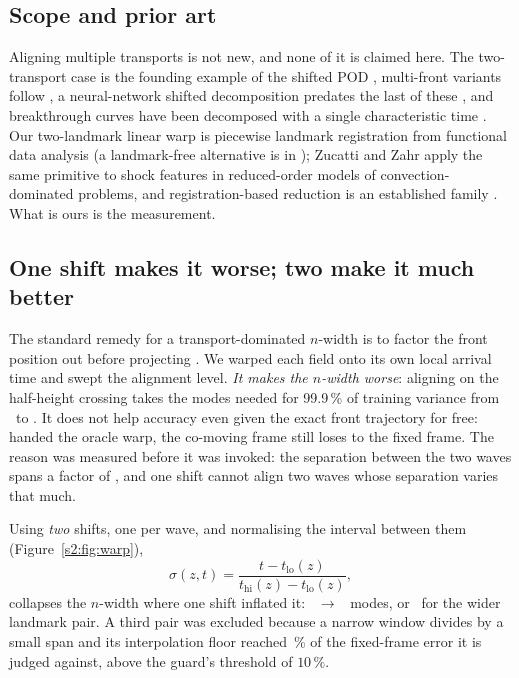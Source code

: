 \subsection{Scope and prior art}

Aligning multiple transports is not new, and none of it is claimed here. The
two-transport case is the founding example of the shifted POD \cite{reiss2018shifted},
multi-front variants follow
\cite{nair2019transported,mendible2020dimensionality,krah2025robust,krah2023front,zorawski2024neural},
a neural-network shifted decomposition predates the last of these
\cite{papapicco2022nnspod}, and breakthrough curves have been decomposed with a single
characteristic time \cite{lee2026scaleup}. Our two-landmark linear warp is piecewise
landmark registration from functional data analysis \cite{kneip1992statistical} (a
landmark-free alternative is in \cite{ramsay1998curve}); Zucatti and Zahr
\cite{zucatti2026model} apply the same primitive to shock features in reduced-order
models of convection-dominated problems, and registration-based reduction is an
established family \cite{taddei2020registration,taddei2026erratum}. What is ours is the
measurement.

\subsection{One shift makes it worse; two make it much better}

The standard remedy for a transport-dominated \(n\)-width is to factor the front
position out before projecting \cite{reiss2018shifted}. We warped each field onto its own local arrival time
and swept the alignment level. \emph{It makes the \(n\)-width worse}: aligning on
the half-height crossing takes the modes needed for 99.9\,\% of training variance
from \nNwidthOriginal\ to \nNwidthSingle. It does not help accuracy even given
the exact front trajectory for free: handed the oracle warp, the co-moving frame
still loses to the fixed frame. The reason was measured before it was invoked: the separation between the two waves spans a factor of \nGapRange, and one shift cannot align
two waves whose separation varies that much.

Using \emph{two} shifts, one per wave, and normalising the interval between them (Figure~\ref{s2:fig:warp}),
\begin{equation}
\sigma(z,t) = \frac{t - t_{\mathrm{lo}}(z)}{t_{\mathrm{hi}}(z) - t_{\mathrm{lo}}(z)},
\label{s2:eq:warp}
\end{equation}
collapses the \(n\)-width where one shift inflated it: \nNwidthOriginal\ \(\to\)
\nNwidthTwoWaveA\ modes, or \nNwidthTwoWaveB\ for the wider landmark pair. A third
pair was excluded because a narrow window divides by a small span and its
interpolation floor reached \nComovingFloorPct\,\% of the fixed-frame error it is judged
against, above the guard's threshold of \(10\,\%\).

